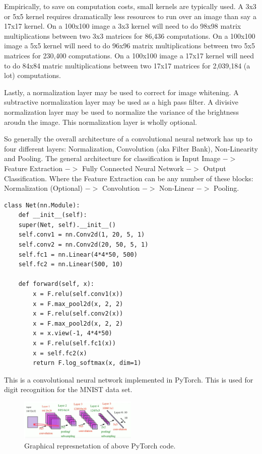 Empirically, to save on computation costs, small kernels are typically used.
A 3x3 or 5x5 kernel requires dramatically less resources to run over an image than say a 17x17 kernel.
On a 100x100 image a 3x3 kernel will need to do 98x98 matrix multiplications between two 3x3 matrices for 86,436 computations.
On a 100x100 image a 5x5 kernel will need to do 96x96 matrix multiplications between two 5x5 matrices for 230,400 computations.
On a 100x100 image a 17x17 kernel will need to do 84x84 matric multiplications between two 17x17 matrices for 2,039,184 (a lot) computations.

Lastly, a normalization layer may be used to correct for image whitening.
A subtractive normalization layer may be used as a high pass filter.
A divisive normalization layer may be used to normalize the variance of the brightness aroudn the image.
This normalization layer is wholly optional.

So generally the overall architecture of a convolutional neural network has up to four different layers: Normalization, Convolution (aka Filter Bank), Non-Linearity and Pooling.
The general architecture for classification is Input Image $->$ Feature Extraction $->$ Fully Connected Neural Network $->$ Output Classification. 
Where the Feature Extraction can be any number of these blocks: Normalization (Optional) $->$ Convolution $->$ Non-Linear $->$ Pooling.

\begin{verbatim}
class Net(nn.Module):
    def __init__(self):
    super(Net, self).__init__()
    self.conv1 = nn.Conv2d(1, 20, 5, 1)
    self.conv2 = nn.Conv2d(20, 50, 5, 1)
    self.fc1 = nn.Linear(4*4*50, 500)
    self.fc2 = nn.Linear(500, 10)
    
    def forward(self, x):
        x = F.relu(self.conv1(x))
        x = F.max_pool2d(x, 2, 2)
        x = F.relu(self.conv2(x))
        x = F.max_pool2d(x, 2, 2)
        x = x.view(-1, 4*4*50)
        x = F.relu(self.fc1(x))
        x = self.fc2(x)
        return F.log_softmax(x, dim=1)
\end{verbatim}

This is a convolutional neural network implemented in PyTorch. This is used for
digit recognition for the MNIST data set. 

\begin{figure}[ht]
  \centering
      \includegraphics[width=0.5\textwidth]{lectures/03-b/images/PyTorchCNN.png}
          \caption{Graphical represnetation of above PyTorch code.}
\end{figure}

